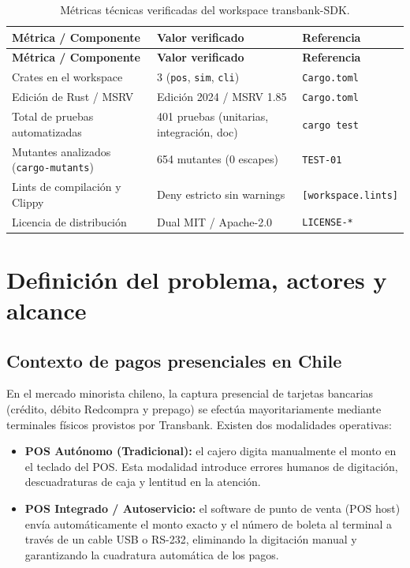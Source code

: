 \documentclass{../../plantilla/raysac-informe}
\begin{document}
\begin{longtable}{@{}p{6.5cm}p{4.5cm}p{3.5cm}@{}}
\caption{Métricas técnicas verificadas del workspace transbank-SDK.}\label{tab:metricas-repo}\\
\toprule
\textbf{Métrica / Componente} & \textbf{Valor verificado} & \textbf{Referencia} \\
\midrule
\endfirsthead
\toprule
\textbf{Métrica / Componente} & \textbf{Valor verificado} & \textbf{Referencia} \\
\midrule
\endhead
\bottomrule
\endlastfoot
Crates en el workspace & 3 (\texttt{pos}, \texttt{sim}, \texttt{cli}) & \texttt{Cargo.toml} \\
Edición de Rust / MSRV & Edición 2024 / MSRV 1.85 & \texttt{Cargo.toml} \\
Total de pruebas automatizadas & 401 pruebas (unitarias, integración, doc) & \texttt{cargo test} \\
Mutantes analizados (\texttt{cargo-mutants}) & 654 mutantes (0 escapes) & \texttt{TEST-01} \\
Lints de compilación y Clippy & Deny estricto sin warnings & \texttt{[workspace.lints]} \\
Licencia de distribución & Dual MIT / Apache-2.0 & \texttt{LICENSE-*} \\
\end{longtable}

\clearpage
\section{Definición del problema, actores y alcance}

\subsection{Contexto de pagos presenciales en Chile}
En el mercado minorista chileno, la captura presencial de tarjetas bancarias (crédito, débito Redcompra
y prepago) se efectúa mayoritariamente mediante terminales físicos provistos por Transbank. Existen dos
modalidades operativas:
\begin{itemize}
  \item \textbf{POS Autónomo (Tradicional):} el cajero digita manualmente el monto en el teclado del POS.
    Esta modalidad introduce errores humanos de digitación, descuadraturas de caja y lentitud en la atención.
  \item \textbf{POS Integrado / Autoservicio:} el software de punto de venta (POS host) envía automáticamente
    el monto exacto y el número de boleta al terminal a través de un cable USB o RS-232, eliminando la
    digitación manual y garantizando la cuadratura automática de los pagos.
\end{itemize}
\end{document}
